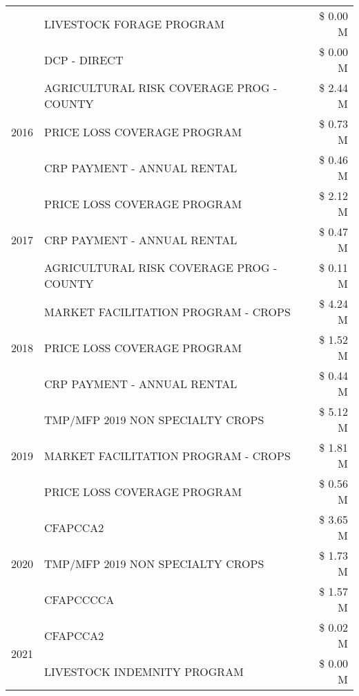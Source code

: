 \begin{tabular}{llr}
 & LIVESTOCK FORAGE PROGRAM & \$ 0.00 M \\
 & DCP - DIRECT & \$ 0.00 M \\
\cline{1-3}
\multirow[t]{3}{*}{2016} & AGRICULTURAL RISK COVERAGE PROG - COUNTY & \$ 2.44 M \\
 & PRICE LOSS COVERAGE PROGRAM & \$ 0.73 M \\
 & CRP PAYMENT - ANNUAL RENTAL & \$ 0.46 M \\
\cline{1-3}
\multirow[t]{3}{*}{2017} & PRICE LOSS COVERAGE PROGRAM & \$ 2.12 M \\
 & CRP PAYMENT - ANNUAL RENTAL & \$ 0.47 M \\
 & AGRICULTURAL RISK COVERAGE PROG - COUNTY & \$ 0.11 M \\
\cline{1-3}
\multirow[t]{3}{*}{2018} & MARKET FACILITATION PROGRAM - CROPS & \$ 4.24 M \\
 & PRICE LOSS COVERAGE PROGRAM & \$ 1.52 M \\
 & CRP PAYMENT - ANNUAL RENTAL & \$ 0.44 M \\
\cline{1-3}
\multirow[t]{3}{*}{2019} & TMP/MFP 2019 NON SPECIALTY CROPS & \$ 5.12 M \\
 & MARKET FACILITATION PROGRAM - CROPS & \$ 1.81 M \\
 & PRICE LOSS COVERAGE PROGRAM & \$ 0.56 M \\
\cline{1-3}
\multirow[t]{3}{*}{2020} & CFAPCCA2 & \$ 3.65 M \\
 & TMP/MFP 2019 NON SPECIALTY CROPS & \$ 1.73 M \\
 & CFAPCCCCA & \$ 1.57 M \\
\cline{1-3}
\multirow[t]{2}{*}{2021} & CFAPCCA2 & \$ 0.02 M \\
 & LIVESTOCK INDEMNITY PROGRAM & \$ 0.00 M \\
\cline{1-3}
\bottomrule
\end{tabular}
